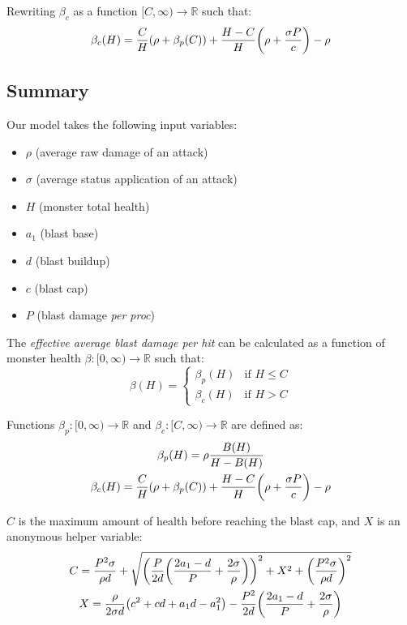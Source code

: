 \documentclass{article}
\begin{document}
Rewriting $\beta_c$ as a function $[C, \infty) \to \mathbb{R}$ such that:
\begin{equation}
    \beta_c (H) = \frac{C}{H} \parens*{\rho + \beta_p(C)} + \frac{H - C}{H} \parens*{\rho + \frac{\sigma P}{c}} - \rho
\end{equation}


\subsection{Summary}%
\label{sub:continuous_model_summary}

Our model takes the following input variables:
\begin{itemize}
    \item $\rho$ (average raw damage of an attack)
    \item $\sigma$ (average status application of an attack)
    \item $H$ (monster total health)
    \item $a_1$ (blast base)
    \item $d$ (blast buildup)
    \item $c$ (blast cap)
    \item $P$ (blast damage \textit{per proc})
\end{itemize}

The \textit{effective average blast damage per hit} can be calculated as a function of monster health $\beta : [0, \infty) \to \mathbb{R}$ such that:
\begin{equation}
    \beta (H) =
        \begin{cases}
            \beta_p (H) & \text{if } H \le C \\
            \beta_c (H) & \text{if } H > C
        \end{cases}
\end{equation}

Functions $\beta_p : [0, \infty) \to \mathbb{R}$ and $\beta_c : [C, \infty) \to \mathbb{R}$ are defined as:
\begin{gather}
    \beta_p (H) = \rho \frac{B(H)}{H - B(H)}
    \\
    \beta_c (H) = \frac{C}{H} \parens*{\rho + \beta_p(C)} + \frac{H - C}{H} \parens*{\rho + \frac{\sigma P}{c}} - \rho
\end{gather}

$C$ is the maximum amount of health before reaching the blast cap, and $X$ is an anonymous helper variable:
\begin{gather}
    C
    =
    \frac{P^2 \sigma}{\rho d}
    + \sqrt{
        \parens*{\frac{P}{2d} \parens*{\frac{2 a_1 - d}{P} + \frac{2 \sigma}{\rho}}}^2
        + X^2
        + \parens*{\frac{P^2 \sigma}{\rho d}}^2
    }
    \\
    X
    =
    \frac{\rho}{2 \sigma d} \parens*{c^2 + c d + a_1 d - a_1^2}
    - \frac{P^2}{2d} \parens*{\frac{2 a_1 - d}{P} + \frac{2 \sigma}{\rho}}
\end{gather}
\end{document}
